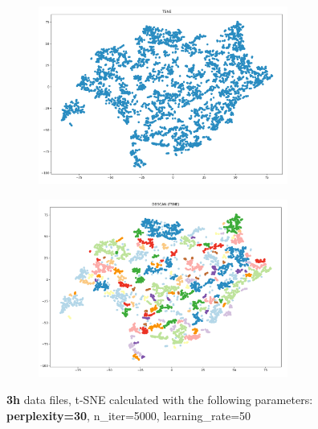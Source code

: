 \begin{figure}[H]
  \centering
	\begin{subfigure}{.5\textwidth}
    \centering
    \includegraphics[width=0.9\textwidth]{./images/tsneParametersTest/perplexity/perp30-3hTSNE.png}
  \end{subfigure}%
  \begin{subfigure}{.5\textwidth}
    \centering
    \includegraphics[width=0.9\textwidth]{./images/tsneParametersTest/perplexity/perp30-3hDBSCAN.png}
	\end{subfigure}
	\caption{\textbf{3h} data files, t-SNE calculated with the following parameters: \textbf{perplexity=30}, n\_iter=5000, learning\_rate=50}
  \label{figure:3hperp30TSNE}
\end{figure}



